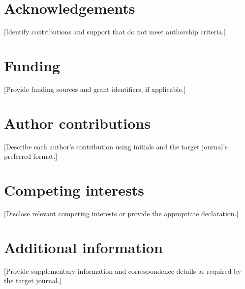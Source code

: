 \section*{Acknowledgements}
[Identify contributions and support that do not meet authorship criteria.]

\section*{Funding}
[Provide funding sources and grant identifiers, if applicable.]

\section*{Author contributions}
[Describe each author's contribution using initials and the target journal's
preferred format.]

\section*{Competing interests}
[Disclose relevant competing interests or provide the appropriate declaration.]

\section*{Additional information}
[Provide supplementary information and correspondence details as required by
the target journal.]
